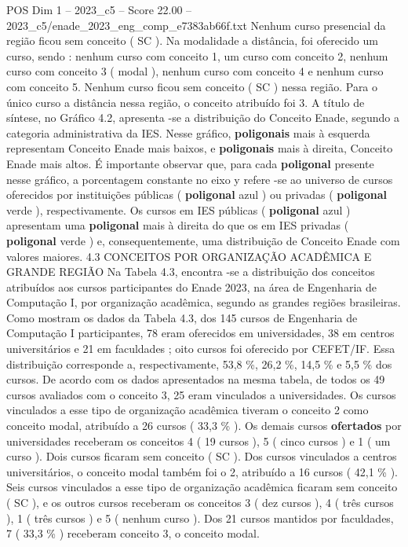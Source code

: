 \begin{textsample}{POS Dim 1 – 2023\_c5 – Score 22.00 – 2023\_c5/enade\_2023\_eng\_comp\_e7383ab66f.txt}
Nenhum curso presencial da região ficou sem conceito ( SC ).
Na modalidade a distância, foi oferecido um curso, sendo : nenhum curso com conceito 1, um curso com conceito 2, nenhum curso com conceito 3 ( modal ), nenhum curso com conceito 4 e nenhum curso com conceito 5.
Nenhum curso ficou sem conceito ( SC ) nessa região.
Para o único curso a distância nessa região, o conceito atribuído foi 3.
A título de síntese, no Gráfico 4.2, apresenta -se a distribuição do Conceito Enade, segundo a categoria administrativa da IES.
Nesse gráfico, \textbf{poligonais} mais à esquerda representam Conceito Enade mais baixos, e \textbf{poligonais} mais à direita, Conceito Enade mais altos.
É importante observar que, para cada \textbf{poligonal} presente nesse gráfico, a porcentagem constante no eixo y refere -se ao universo de cursos oferecidos por instituições públicas ( \textbf{poligonal} azul ) ou privadas ( \textbf{poligonal} verde ), respectivamente.
Os cursos em IES públicas ( \textbf{poligonal} azul ) apresentam uma \textbf{poligonal} mais à direita do que os em IES privadas ( \textbf{poligonal} verde ) e, consequentemente, uma distribuição de Conceito Enade com valores maiores. 4.3 CONCEITOS POR ORGANIZAÇÃO ACADÊMICA E GRANDE REGIÃO Na Tabela 4.3, encontra -se a distribuição dos conceitos atribuídos aos cursos participantes do Enade 2023, na área de Engenharia de Computação I, por organização acadêmica, segundo as grandes regiões brasileiras.
Como mostram os dados da Tabela 4.3, dos 145 cursos de Engenharia de Computação I participantes, 78 eram oferecidos em universidades, 38 em centros universitários e 21 em faculdades ; oito cursos foi oferecido por CEFET/IF.
Essa distribuição corresponde a, respectivamente, 53,8 \%, 26,2 \%, 14,5 \% e 5,5 \% dos cursos.
De acordo com os dados apresentados na mesma tabela, de todos os 49 cursos avaliados com o conceito 3, 25 eram vinculados a universidades.
Os cursos vinculados a esse tipo de organização acadêmica tiveram o conceito 2 como conceito modal, atribuído a 26 cursos ( 33,3 \% ).
Os demais cursos \textbf{ofertados} por universidades receberam os conceitos 4 ( 19 cursos ), 5 ( cinco cursos ) e 1 ( um curso ).
Dois cursos ficaram sem conceito ( SC ).
Dos cursos vinculados a centros universitários, o conceito modal também foi o 2, atribuído a 16 cursos ( 42,1 \% ).
Seis cursos vinculados a esse tipo de organização acadêmica ficaram sem conceito ( SC ), e os outros cursos receberam os conceitos 3 ( dez cursos ), 4 ( três cursos ), 1 ( três cursos ) e 5 ( nenhum curso ).
Dos 21 cursos mantidos por faculdades, 7 ( 33,3 \% ) receberam conceito 3, o conceito modal.

\end{textsample}
